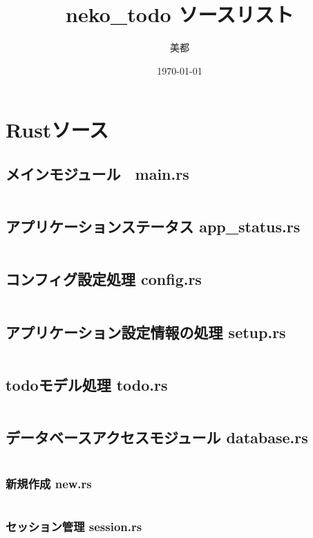 \documentclass[paper=a4paper, fontsize=10pt, head_space=10mm, foot_space=17mm, gutter=17mm, line_length=185mm, twoside]{jlreq}
\title{neko\_todo ソースリスト}
\author{美都}
\date{\today}
\begin{document}
\maketitle
\tableofcontents
\clearpage

\section{Rustソース}
\subsection{メインモジュール　main.rs}
\inputminted[linenos, breaklines]{rust}{src-rs/main.rs}
\clearpage
\subsection{アプリケーションステータス app\_status.rs}
\inputminted[linenos, breaklines]{rust}{src-rs/app_status.rs}
\clearpage

\subsection{コンフィグ設定処理 config.rs}
\inputminted[linenos, breaklines]{rust}{src-rs/config.rs}
\clearpage

\subsection{アプリケーション設定情報の処理 setup.rs}
\inputminted[linenos, breaklines]{rust}{src-rs/setup.rs}
\clearpage

\subsection{todoモデル処理 todo.rs}
\inputminted[linenos, breaklines]{rust}{src-rs/todo.rs}
\clearpage

\subsection{データベースアクセスモジュール database.rs}
\inputminted[linenos, breaklines]{rust}{src-rs/database.rs}
\clearpage

\subsubsection{新規作成 new.rs}
\inputminted[linenos, breaklines]{rust}{src-rs/database/new.rs}
\clearpage

\subsubsection{セッション管理 session.rs}
\inputminted[linenos, breaklines]{rust}{src-rs/database/session.rs}
\clearpage
\end{document}

